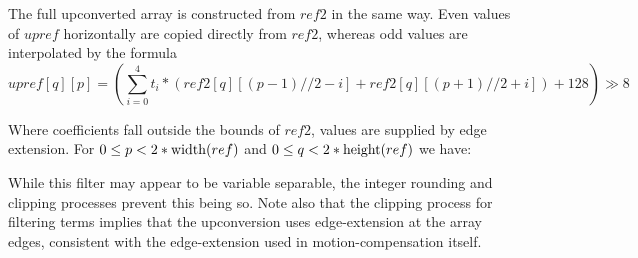 The full upconverted array is constructed from $ref2$ in the same way.
Even values of $upref$ horizontally are copied directly from $ref2$, whereas
odd values are interpolated by the formula
\[
upref[q][p]=  \left(\sum_{i=0}^{4} t_i *
\left(
 ref2[q][(p-1)//2-i]
+ref2[q][(p+1)//2+i]
\right)+128 \right)\gg8
\]

Where coefficients fall outside the bounds of $ref2$, values
are supplied by edge extension.
For $0\leq p<2*\operatorname{width}(ref)$ and $0\leq q<2*\operatorname{height}(ref)$ we have:

\begin{pseudo*}
\bsELSE
  \bsEND
\bsEND
\end{pseudo*}

\begin{informative}
While this filter may appear to be variable separable, the integer rounding and 
clipping processes prevent this being so. Note also that the clipping process for
filtering terms implies that the upconversion uses edge-extension at the array
edges, consistent with the edge-extension used in motion-compensation itself.
\end{informative}


